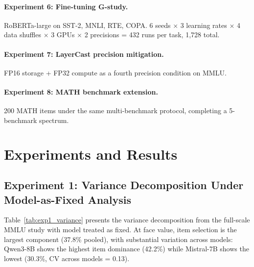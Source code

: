 \documentclass[11pt]{article}
\begin{document}
\paragraph{Experiment 6: Fine-tuning G-study.}
RoBERTa-large on SST-2, MNLI, RTE, COPA. 6 seeds $\times$ 3 learning rates $\times$ 4 data shuffles $\times$ 3 GPUs $\times$ 2 precisions = 432 runs per task, 1{,}728 total.

\paragraph{Experiment 7: LayerCast precision mitigation.}
FP16 storage + FP32 compute as a fourth precision condition on MMLU.

\paragraph{Experiment 8: MATH benchmark extension.}
200 MATH items under the same multi-benchmark protocol, completing a 5-benchmark spectrum.

\section{Experiments and Results}

\subsection{Experiment 1: Variance Decomposition Under Model-as-Fixed Analysis}
\label{sec:exp1}

Table~\ref{tab:exp1_variance} presents the variance decomposition from the full-scale MMLU study with model treated as fixed.
At face value, item selection is the largest component (37.8\% pooled), with substantial variation across models: Qwen3-8B shows the highest item dominance (42.2\%) while Mistral-7B shows the lowest (30.3\%, CV across models = 0.13).
\end{document}
